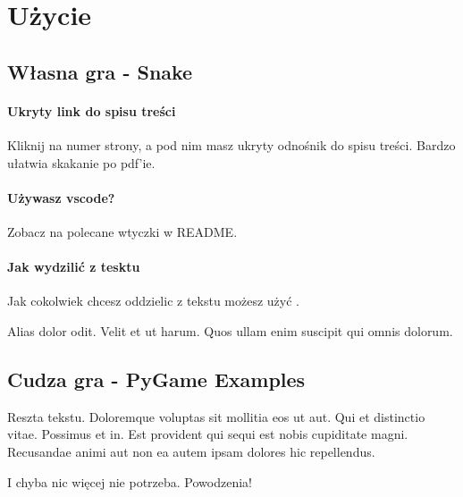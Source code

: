 \section{Użycie}



\subsection{Własna gra - Snake}
\paragraph{Ukryty link do spisu treści}
Kliknij na numer strony, a pod nim masz ukryty odnośnik do spisu treści. Bardzo ułatwia skakanie po pdf'ie.

\paragraph{Używasz vscode?}
Zobacz na polecane wtyczki w README.

\paragraph{Jak wydzilić z tesktu}
Jak cokolwiek chcesz oddzielic z tekstu możesz użyć .

\begin{onepage}[1cm]
    \centering
    Alias dolor odit. Velit et ut harum. Quos ullam enim suscipit qui omnis dolorum.
\end{onepage}

\subsection{Cudza gra - PyGame Examples}
Reszta tekstu.
Doloremque voluptas sit mollitia eos ut aut. Qui et distinctio vitae. Possimus et in. Est provident qui sequi est nobis cupiditate magni. Recusandae animi aut non ea autem ipsam dolores hic repellendus.

I chyba nic więcej nie potrzeba. Powodzenia!
